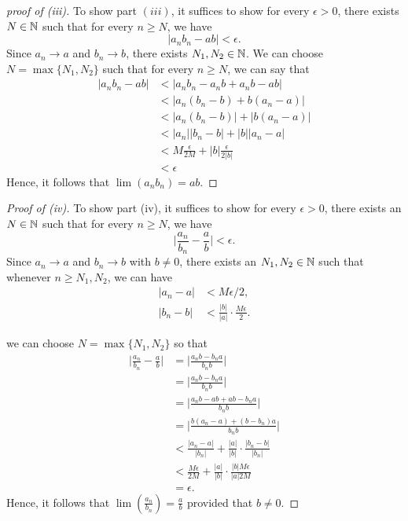 \begin{proof}[proof of (iii)]
    To show part \( (iii)\), it suffices to show for every \( \epsilon  > 0 \), there exists \( N \in \mathbb{N} \) such that for every \( n \geq N \), we have 
    \[ | a_nb_n - ab | < \epsilon.\]
Since \( a_n \to a \) and \( b_n \to b\), there exists \( N_1 , N_2 \in \mathbb{N} \). We can choose \( N = \max \{ N_1, N_2  \}\) such that for every \( n \geq N \), we can say that 
\begin{align*}
 | a_nb_n - ab |&< | a_nb_n -a_nb + a_nb - ab |  \\
                &< | a_n (b_n - b ) + b (a_n - a)| \\ 
                &< | a_n (b_n - b) |  + | b (a_n - a) | \\ 
                &< | a_n | | b_n - b  |  + | b | | a_n - a |  \\
                &< M \frac{ \epsilon }{2 M }  + | b | \frac{ \epsilon }{2 | b |} \tag{ \( a_n \) is bounded } \\ 
                &< \epsilon  
\end{align*}
Hence, it follows that \( \lim (a_nb_n) = ab\).
\end{proof}

\begin{proof}[Proof of (iv)]
To show part (iv), it suffices to show for every \( \epsilon  > 0 \), there exists an \( N \in \mathbb{N}\) such that for every \( n \geq N \), we have 
\[ \Big| \frac{a_n}{b_n} - \frac{a}{b} \Big| < \epsilon.\]
Since \( a_n \to a \) and \( b_n \to b\) with \( b \neq 0 \), there exists an \( N_1, N_2 \in \mathbb{N}   \) such that whenever \( n \geq N_1, N_2\), we can have
\begin{align*}
 | a_n - a  |&<  M \epsilon / 2,  \\
 | b_n - b | &<  \frac{ | b |}{ | a |} \cdot \frac{ M \epsilon }{2}.
\end{align*}



we can choose \( N = \max \{ N_1, N_2 \}\) so that 
\begin{align*}
   \Big| \frac{a_n}{b_n} - \frac{a}{b} \Big| &=  \Big| \frac{a_nb - b_n a}{b_nb} \Big|   \\
                                     &=  \Big| \frac{a_nb - b_n a}{b_nb} \Big| \\
                                     &= \Big| \frac{a_nb - ab + ab- b_n a}{b_nb} \Big| \\
                                     &=  \Big| \frac{b(a_n - a) + (b- b_n)a}{b_nb} \Big| \\
                                     &<  \frac{|a_n - a|}{|b_n|} + \frac{ | a |}{ | b |} \cdot \frac{|b_n - b|}{|b_n|} \\
                                     &< \frac{ M \epsilon }{ 2M} + \frac{ | a |}{ | b |} \cdot \frac{ | b | M  \epsilon}{  | a | 2 M} \tag{ \( b_n\) bounded} \\
                                     &= \epsilon. 
\end{align*}
Hence, it follows that \( \lim ( \frac{a_n}{b_n} ) = \frac{a}{b} \) provided that \( b \neq 0\).



\end{proof}

